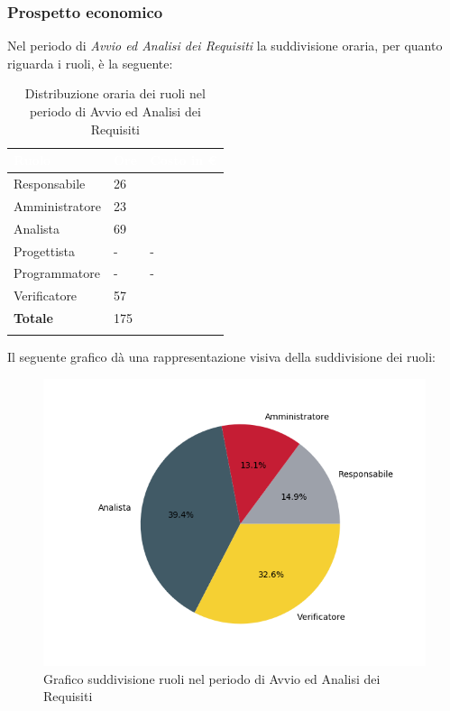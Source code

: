 \subsubsection{Prospetto economico}
Nel periodo di \textit{Avvio ed Analisi dei Requisiti} la suddivisione oraria, per quanto riguarda i ruoli, è la seguente: 

\begin{longtable}{| C{.30\textwidth}| C{.15\textwidth}| C{.20\textwidth}|}
\hline
{}\textbf{\textcolor{white}{Ruolo}} & \textbf{\textcolor{white}{Ore}} & \textbf{\textcolor{white}{Costo in \euro}} \\
\hline
Responsabile & 26 &  \\
\hline
{}Amministratore & 23 &  \\
\hline
Analista & 69 &  \\
\hline
{}Progettista & - & - \\
\hline
Programmatore & - & - \\
\hline
{}Verificatore & 57 & \\
\hline
\textbf{Totale} & 175 &  \\
\hline

\caption{Distribuzione oraria dei ruoli nel periodo di Avvio ed Analisi dei Requisiti}
\label{tab: distribuzione oraria aar}
\end{longtable}

Il seguente grafico dà una rappresentazione visiva della suddivisione dei ruoli:
\begin{figure}[H]
	\centering
  		\includegraphics[width=1\linewidth]{./images/torta_aar.png}
  		\caption{Grafico suddivisione ruoli nel periodo di Avvio ed Analisi dei Requisiti}
  		\label{fig:grafico suddivione ruoli periodo di Avvio ed analisi dei requisiti}
\end{figure}

